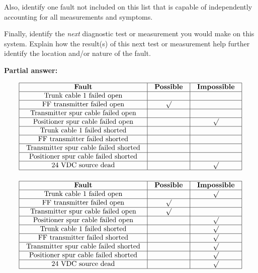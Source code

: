 Also, identify one fault not included on this list that is capable of independently accounting for all measurements and symptoms.

Finally, identify the {\it next} diagnostic test or measurement you would make on this system.  Explain how the result(s) of this next test or measurement help further identify the location and/or nature of the fault.







\noindent
{\bf Partial answer:}


$$\vbox{\offinterlineskip
\halign{\strut
\vrule \quad\hfil # \ \hfil & 
\vrule \quad\hfil # \ \hfil & 
\vrule \quad\hfil # \ \hfil \vrule \cr
\noalign{\hrule}
%
{\bf Fault} & {\bf Possible} & {\bf Impossible} \cr
%
\noalign{\hrule}
%
Trunk cable 1 failed open &  &  \cr
%
\noalign{\hrule}
%
FF transmitter failed open & $\surd$ &  \cr
%
\noalign{\hrule}
%
Transmitter spur cable failed open &  &  \cr
%
\noalign{\hrule}
%
Positioner spur cable failed open &  & $\surd$ \cr
%
\noalign{\hrule}
%
Trunk cable 1 failed shorted &  &  \cr
%
\noalign{\hrule}
%
FF transmitter failed shorted &  &  \cr
%
\noalign{\hrule}
%
Transmitter spur cable failed shorted &  &  \cr
%
\noalign{\hrule}
%
Positioner spur cable failed shorted &  &  \cr
%
\noalign{\hrule}
%
24 VDC source dead &  & $\surd$ \cr
%
\noalign{\hrule}
} %
}$$ %









$$\vbox{\offinterlineskip
\halign{\strut
\vrule \quad\hfil # \ \hfil & 
\vrule \quad\hfil # \ \hfil & 
\vrule \quad\hfil # \ \hfil \vrule \cr
\noalign{\hrule}
%
{\bf Fault} & {\bf Possible} & {\bf Impossible} \cr
%
\noalign{\hrule}
%
Trunk cable 1 failed open &  & $\surd$ \cr
%
\noalign{\hrule}
%
FF transmitter failed open & $\surd$ &  \cr
%
\noalign{\hrule}
%
Transmitter spur cable failed open & $\surd$ &  \cr
%
\noalign{\hrule}
%
Positioner spur cable failed open &  & $\surd$ \cr
%
\noalign{\hrule}
%
Trunk cable 1 failed shorted &  & $\surd$ \cr
%
\noalign{\hrule}
%
FF transmitter failed shorted &  & $\surd$ \cr
%
\noalign{\hrule}
%
Transmitter spur cable failed shorted &  & $\surd$ \cr
%
\noalign{\hrule}
%
Positioner spur cable failed shorted &  & $\surd$ \cr
%
\noalign{\hrule}
%
24 VDC source dead &  & $\surd$ \cr
%
\noalign{\hrule}
} %
}$$ %

